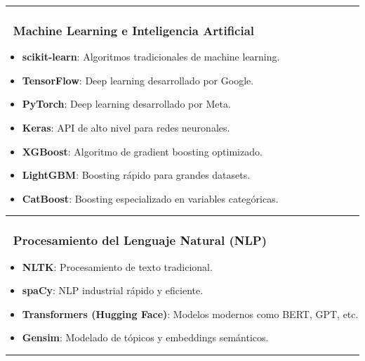 \documentclass[
]{book}
\providecommand{\tightlist}{%
  \setlength{\itemsep}{0pt}\setlength{\parskip}{0pt}}
\theoremstyle{break}
\theoremstyle{nonumberplain}
\begin{document}
\begin{center}\rule{0.5\linewidth}{0.5pt}\end{center}

\subsubsection{🤖 Machine Learning e Inteligencia Artificial}\label{machine-learning-e-inteligencia-artificial}

\begin{itemize}
\tightlist
\item
  \textbf{scikit-learn}: Algoritmos tradicionales de machine learning.
\item
  \textbf{TensorFlow}: Deep learning desarrollado por Google.
\item
  \textbf{PyTorch}: Deep learning desarrollado por Meta.
\item
  \textbf{Keras}: API de alto nivel para redes neuronales.
\item
  \textbf{XGBoost}: Algoritmo de gradient boosting optimizado.
\item
  \textbf{LightGBM}: Boosting rápido para grandes datasets.
\item
  \textbf{CatBoost}: Boosting especializado en variables categóricas.
\end{itemize}

\begin{center}\rule{0.5\linewidth}{0.5pt}\end{center}

\subsubsection{🧠 Procesamiento del Lenguaje Natural (NLP)}\label{procesamiento-del-lenguaje-natural-nlp}

\begin{itemize}
\tightlist
\item
  \textbf{NLTK}: Procesamiento de texto tradicional.
\item
  \textbf{spaCy}: NLP industrial rápido y eficiente.
\item
  \textbf{Transformers (Hugging Face)}: Modelos modernos como BERT, GPT, etc.
\item
  \textbf{Gensim}: Modelado de tópicos y embeddings semánticos.
\end{itemize}

\begin{center}\rule{0.5\linewidth}{0.5pt}\end{center}
\end{document}
